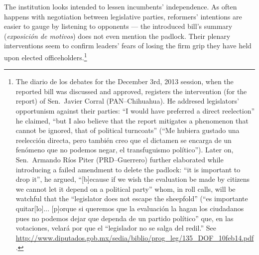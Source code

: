 \documentclass[letter,12pt]{article}
\begin{document}
The institution looks intended to lessen incumbents' independence. As often happens with negotiation between legislative parties, reformers' intentions are easier to gauge by listening to opponents --- the introduced bill's summary (\emph{exposición de motivos}) does not even mention the padlock. Their plenary interventions seem to confirm leaders' fears of losing the firm grip they have held upon elected officeholders.\footnote{The diario de los debates for the December 3rd, 2013 session, when the reported bill was discussed and approved, registers the intervention (for the report) of Sen.\ Javier Corral (PAN--Chihuahua). He addresed legislators' opportunism against their parties: ``I would have preferred a direct reelection'' he claimed, ``but I also believe that the report mitigates a phenomenon that cannot be ignored, that of political turncoats'' (``Me hubiera gustado una reelección directa, pero también creo que el dictamen se encarga de un fenómeno que no podemos negar, el transfuguismo político''). Later on, Sen.\ Armando Ríos Piter (PRD--Guerrero) further elaborated while introducing a failed amendment to delete the padlock: ``it is important to drop it'', he argued, ``[b]ecause if we wish the evaluation be made by citizens we cannot let it depend on a political party'' whom, in roll calls, will be watchful that the ``legislator does not escape the sheepfold'' (``es importante quitar[lo]... [p]orque si queremos que la evaluación la hagan los ciudadanos pues no podemos dejar que dependa de un partido político'' que, en las votaciones, velará por que el ``legislador no se salga del redil.'' See \url{http://www.diputados.gob.mx/sedia/biblio/prog_leg/135_DOF_10feb14.pdf}.}


\end{document}
